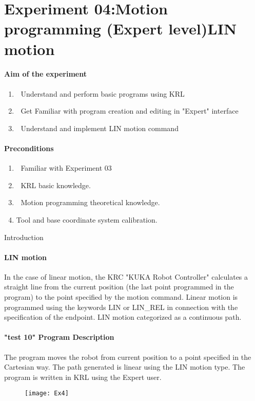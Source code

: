 \documentclass[]{book}
\begin{document}
\section{Experiment 04:Motion programming (Expert level)LIN motion}
\paragraph{Aim of the experiment}
\begin{enumerate}
	\item 	Understand and perform basic programs using KRL
	\item 	Get Familiar with program creation and editing in "Expert" interface
	\item 	Understand and implement LIN motion command
\end{enumerate}
\paragraph{Preconditions}
\begin{enumerate}
	\item 	Familiar with Experiment 03
	\item 	KRL basic knowledge.
	\item 	Motion programming theoretical knowledge. 
	\item Tool and base coordinate system calibration.

\end{enumerate}
{Introduction}
\paragraph{LIN motion}
In the case of linear motion, the KRC "KUKA Robot Controller" calculates a straight line from the current position (the last point programmed in the program) to the point specified by the motion command. Linear motion is programmed using the keywords LIN or LIN\_REL in connection with the specification of the endpoint.
LIN motion categorized as a continuous path.
\paragraph{"test 10" Program Description}
The program moves the robot from current position to a point specified in the Cartesian way.  The path generated is linear using the LIN motion type. The program is written in KRL using the Expert user.
\begin{figure}[H]
	\centering
	\texttt{[image: Ex4]}
\end{figure}
\end{document}
